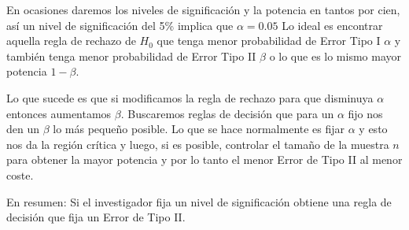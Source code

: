 \documentclass[12pt]{report}
\begin{document}
En ocasiones daremos los niveles de significación y  la potencia en tantos por cien, así
un nivel de significación del 5\% implica que $\alpha=0.05$
Lo ideal es encontrar aquella regla de rechazo de $H_{0}$ que tenga menor probabilidad de Error Tipo I $\alpha$ y también tenga menor probabilidad de Error Tipo II $\beta$ o lo que es lo mismo mayor potencia $1-\beta$.

Lo que sucede es que si modificamos la regla de rechazo para que disminuya $\alpha$ entonces aumentamos $\beta$.
Buscaremos  reglas de decisión que para un $\alpha$ fijo nos den un $\beta$ lo más pequeño posible.
Lo que se hace normalmente es fijar $\alpha$ y esto  nos da la región crítica y luego, si es posible, controlar el tamaño de la muestra $n$ para
 obtener la mayor potencia y por lo tanto el menor Error de Tipo II
al menor coste.

En resumen: Si el investigador fija un nivel de significación obtiene una regla de
    decisión que fija un Error de Tipo II.
\end{document}
